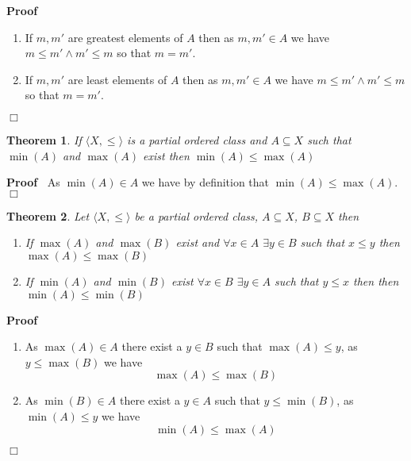 \documentclass{book}
\newenvironment{proof}{\noindent\textbf{Proof\ }}{\hspace*{\fill}$\Box$\medskip}
\newtheorem{theorem}{Theorem}
\begin{document}
\begin{proof}
  
  \begin{enumerate}
    \item If $m, m'$ are greatest elements of $A$ then as $m, m' \in A$ we
    have $m \leqslant m' \wedge m' \leqslant m$ so that $m = m'$.
    
    \item If $m, m'$ are least elements of $A$ then as $m, m' \in A$ we have
    $m \leqslant m' \wedge m' \leqslant m$ so that $m = m'$.
  \end{enumerate}
\end{proof}

\begin{theorem}
  \label{order min(A)<less>=max(A)}If $\langle X, \leqslant \rangle$ is a
  partial ordered class and $A \subseteq X$ such that $\min (A)$ and $\max
  (A)$ exist then $\min (A) \leqslant \max (A)$
\end{theorem}

\begin{proof}
  As $\min (A) \in A$ we have by definition that $\min (A) \leqslant \max
  (A)$.
\end{proof}

\begin{theorem}
  \label{order maximum of class with bigger elements}Let $\langle X, \leqslant
  \rangle$ be a partial ordered class, $A \subseteq X$, $B \subseteq X$ then
  \begin{enumerate}
    \item If $\max (A)$ and $\max (B)$ exist and $\forall x \in A$ $\exists y
    \in B$ such that $x \leqslant y$ then $\max (A) \leqslant \max (B)$
    
    \item If $\min (A)$ and $\min (B)$ exist $\forall x \in B$ $\exists y \in
    A$ such that $y \leqslant x$ then then $\min (A) \leqslant \min (B)$
  \end{enumerate}
\end{theorem}

\begin{proof}
  
  \begin{enumerate}
    \item As $\max (A) \in A$ there exist a $y \in B$ such that $\max (A)
    \leqslant y$, as $y \leqslant \max (B)$ we have
    \[ \max (A) \leqslant \max (B) \]
    \item As $\min (B) \in A$ there exist a $y \in A$ such that $y \leqslant
    \min (B)$, as $\min (A) \leqslant y$ we have
    \[ \min (A) \leqslant \max (A) \]
  \end{enumerate}
\end{proof}
\end{document}
